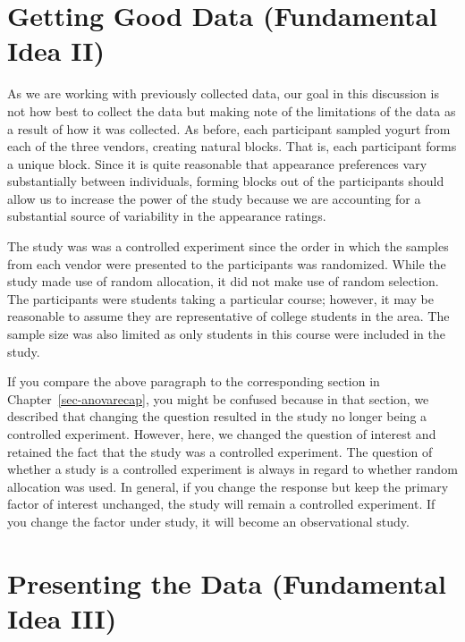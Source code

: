\documentclass[
  letterpaper,
  DIV=11,
  numbers=noendperiod]{scrreprt}
\theoremstyle{definition}
\theoremstyle{definition}
\theoremstyle{plain}
\theoremstyle{remark}
\begin{document}
\hypertarget{getting-good-data-fundamental-idea-ii-2}{%
\section{Getting Good Data (Fundamental Idea
II)}\label{getting-good-data-fundamental-idea-ii-2}}

As we are working with previously collected data, our goal in this
discussion is not how best to collect the data but making note of the
limitations of the data as a result of how it was collected. As before,
each participant sampled yogurt from each of the three vendors, creating
natural blocks. That is, each participant forms a unique block. Since it
is quite reasonable that appearance preferences vary substantially
between individuals, forming blocks out of the participants should allow
us to increase the power of the study because we are accounting for a
substantial source of variability in the appearance ratings.

The study was was a controlled experiment since the order in which the
samples from each vendor were presented to the participants was
randomized. While the study made use of random allocation, it did not
make use of random selection. The participants were students taking a
particular course; however, it may be reasonable to assume they are
representative of college students in the area. The sample size was also
limited as only students in this course were included in the study.

If you compare the above paragraph to the corresponding section in
Chapter~\ref{sec-anovarecap}, you might be confused because in that
section, we described that changing the question resulted in the study
no longer being a controlled experiment. However, here, we changed the
question of interest and retained the fact that the study was a
controlled experiment. The question of whether a study is a controlled
experiment is always in regard to whether random allocation was used. In
general, if you change the response but keep the primary factor of
interest unchanged, the study will remain a controlled experiment. If
you change the factor under study, it will become an observational
study.

\hypertarget{presenting-the-data-fundamental-idea-iii-2}{%
\section{Presenting the Data (Fundamental Idea
III)}\label{presenting-the-data-fundamental-idea-iii-2}}
\end{document}
